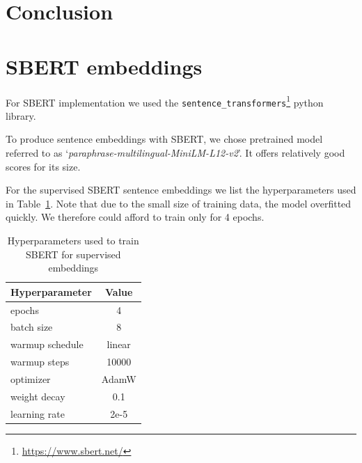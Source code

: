 \documentclass[11pt]{article}
\begin{document}





\section{Conclusion}





\clearpage
\appendix
\section{SBERT embeddings}\label{appendix:sbert_embeddings}

For SBERT implementation we used the
\texttt{sentence\_transformers}\footnote{\url{https://www.sbert.net/}} python
library.

To produce sentence embeddings with SBERT, we chose pretrained model referred
to as `\textit{paraphrase-multilingual-MiniLM-L12-v2}'. It offers relatively
good scores for its size.

For the supervised SBERT sentence embeddings we list the hyperparameters used
in Table~\ref{tab:sbert_supervised_hparams}. Note that due to the small size of
training data, the model overfitted quickly. We therefore could afford to train
only for 4 epochs.

\begin{table}[htp]
  \centering
  \begin{tabular}{l c}
    \toprule
    Hyperparameter & Value\\
    \midrule
    epochs & 4 \\
    batch size & 8 \\
    warmup schedule & linear \\
    warmup steps & 10000 \\
    optimizer & AdamW \\
    weight decay & 0.1 \\
    learning rate & 2e-5 \\
    \bottomrule
  \end{tabular}

  \caption{Hyperparameters used to train SBERT for supervised
  embeddings}\label{tab:sbert_supervised_hparams}

\end{table}
\end{document}
